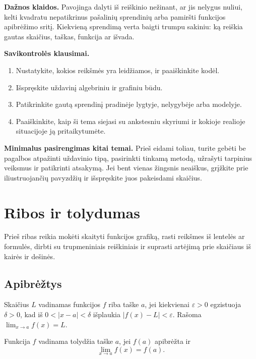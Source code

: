 \textbf{Dažnos klaidos.} Pavojinga dalyti iš reiškinio nežinant, ar jis nelygus nuliui, kelti kvadratu nepatikrinus pašalinių sprendinių arba pamiršti funkcijos apibrėžimo sritį. Kiekvieną sprendimą verta baigti trumpu sakiniu: ką reiškia gautas skaičius, taškas, funkcija ar išvada.

\textbf{Savikontrolės klausimai.}
\begin{enumerate}[label=\arabic*.]
\item Nustatykite, kokios reikšmės yra leidžiamos, ir paaiškinkite kodėl.
\item Išspręskite uždavinį algebriniu ir grafiniu būdu.
\item Patikrinkite gautą sprendinį pradinėje lygtyje, nelygybėje arba modelyje.
\item Paaiškinkite, kaip ši tema siejasi su ankstesniu skyriumi ir kokioje realioje situacijoje ją pritaikytumėte.
\end{enumerate}

\textbf{Minimalus pasirengimas kitai temai.} Prieš eidami toliau, turite gebėti be pagalbos atpažinti uždavinio tipą, pasirinkti tinkamą metodą, užrašyti tarpinius veiksmus ir patikrinti atsakymą. Jei bent vienas žingsnis neaiškus, grįžkite prie iliustruojančių pavyzdžių ir išspręskite juos pakeisdami skaičius.

\section{Ribos ir tolydumas}\label{sec:ribos-ir-tolydumas}

\begin{tcolorbox}[title=Prieš pradedant, colback=green!5]
Prieš ribas reikia mokėti skaityti funkcijos grafiką, rasti reikšmes iš lentelės ar formulės, dirbti su trupmeniniais reiškiniais ir suprasti artėjimą prie skaičiaus iš kairės ir dešinės.
\end{tcolorbox}
\subsection{Apibrėžtys}

\begin{apibreztis}
Skaičius $L$ vadinamas funkcijos $f$ riba taške $a$, jei kiekvienai $\varepsilon>0$ egzistuoja $\delta>0$, kad iš $0<|x-a|<\delta$ išplaukia $|f(x)-L|<\varepsilon$. Rašoma $\lim_{x\to a}f(x)=L$.
\end{apibreztis}

\begin{apibreztis}
Funkcija $f$ vadinama tolydžia taške $a$, jei $f(a)$ apibrėžta ir
\[
\lim_{x\to a}f(x)=f(a).
\]
\end{apibreztis}

